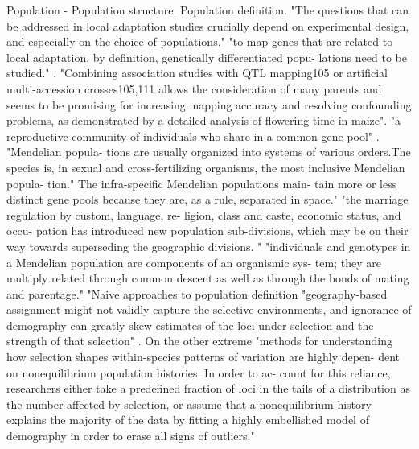 \documentclass[10pt,letterpaper]{article}
\begin{document}
Population - Population structure.
Population definition. "The questions that can be addressed in local adaptation studies crucially depend on experimental design, and especially on the choice of populations." \cite{Savolainen:2013df} "to map genes that are related to local adaptation, by definition, genetically differentiated popu- lations need to be studied." \cite{Savolainen:2013df}. "Combining association studies with QTL mapping105 or artificial multi-accession crosses105,111 allows the consideration of many parents and seems to be promising for increasing mapping accuracy and resolving confounding problems, as demonstrated by a detailed analysis of flowering time in maize"\cite{Savolainen:2013df}. "a reproductive community of individuals who share in a common gene pool" \cite{DOBZHANSKY:1955uz,Dobzhansky:1950}. "Mendelian popula- tions are usually organized into systems of various orders.The species is, in sexual and cross-fertilizing organisms, the most inclusive Mendelian popula- tion." \cite{DOBZHANSKY:1955uz}  The infra-specific Mendelian populations main- tain more or less distinct gene pools because they are, as a rule, separated in space." \cite{DOBZHANSKY:1955uz} "the marriage regulation by custom, language, re- ligion, class and caste, economic status, and occu- pation has introduced new population sub-divisions, which may be on their way towards superseding the geographic divisions. "  \cite{DOBZHANSKY:1955uz} "individuals and genotypes in a Mendelian population are components of an organismic sys- tem; they are multiply related through common descent as well as through the bonds of mating and parentage."\cite{DOBZHANSKY:1955uz}  "Naive approaches to population definition "geography-based assignment might not validly capture the selective environments, and ignorance of demography can greatly skew estimates of the loci under selection and the strength of that selection" \cite{Tiffin:2014ft}. On the other extreme "methods for understanding how selection shapes within-species patterns of variation are highly depen- dent on nonequilibrium population histories. In order to ac- count for this reliance, researchers either take a predefined fraction of loci in the tails of a distribution as the number affected by selection, or assume that a nonequilibrium history explains the majority of the data by fitting a highly embellished model of demography in order to erase all signs of outliers." \cite{Kern:2018db}
\end{document}
